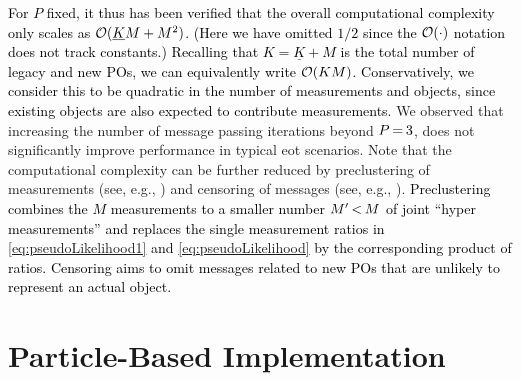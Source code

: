 \documentclass[10pt, twoside, romanappendices]{IEEEtran}
\providecommand{\rd}{\textcolor{black}}
\providecommand{\rmv}{\hspace*{-.3mm}}
\begin{document}
\rd{For $P$ fixed, it thus has been verified that the overall computational complexity only scales as $\Set{O}(\underline{K} M + M^2)$. (Here we have omitted $1/2$ since the $\Set{O}(\cdot)$ notation does not track constants.) Recalling that $K=\underline{K}+M$ is the total number of legacy and new POs, we can equivalently write $\Set{O}(KM)$. Conservatively, we consider this to be quadratic in the number of measurements and objects, since existing objects are also expected to contribute measurements.} We observed that increasing the number of message passing iterations beyond $P \rmv = \rmv 3$, does not significantly improve performance in typical \ac{eot} scenarios. Note that the computational complexity can be further reduced by preclustering of measurements (see, e.g., \cite[Section~IV]{GraLunOrg:J12}) and censoring of messages (see, e.g., \cite[Section~IV]{MeyWil:C20}). \rd{Preclustering combines the $M$ measurements  to a smaller number $M'\rmv<\rmv M$ of joint ``hyper measurements'' and replaces the single measurement ratios in \eqref{eq:pseudoLikelihood1} and \eqref{eq:pseudoLikelihood} by the corresponding product of \vspace{0mm} ratios. Censoring aims to omit messages related to new POs that are unlikely to represent an actual object.}


\section{Particle-Based Implementation}
\label{sec:particleBased}
\end{document}
